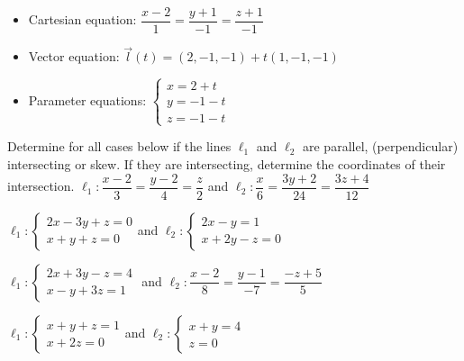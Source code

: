 \begin{Answer}
\begin{itemize}
		    \item Cartesian equation: $\dfrac{x-2}{1} = \dfrac{y+1}{-1} = \dfrac{z+1}{-1} $ \\[0.2cm]  
            \item Vector equation: $\vec l(t) = (2,-1,-1) + t (1,-1,-1)$ \\[0.2cm]
            \item Parameter equations: $\left\{ \begin{array}{l} x = 2+t \\ y = -1-t \\ z = -1-t \end{array} \right.$
		\end{itemize}

\end{Answer}

\begin{Exercise} Determine for all cases below if the lines $\ell_1$ and $\ell_2$ are parallel, (perpendicular) intersecting or skew. If they are intersecting, determine the coordinates of their intersection.
         \Question[difficulty = 1] $\ell_1: \dfrac{x-2}{3}=\dfrac{y-2}{4}=\dfrac{z}{2}$ \qquad and  \qquad $\ell_2: \dfrac{x}{6}=\dfrac{3y+2}{24}=\dfrac{3z+4}{12}$
   
         \Question[difficulty = 2] $\ell_1: \left\{\begin{array}{l}
         2x-3y+z=0\\x+y+z=0
         \end{array}\right.$\qquad and \qquad
         $\ell_2:\left\{\begin{array}{l}
         2x-y=1\\x+2y-z=0
         \end{array}\right.$
        
         \Question[difficulty = 2] 
         $\ell_1: \left\{\begin{array}{l}
         2x+3y-z=4\\x-y+3z=1
         \end{array}\right.$ \qquad and \qquad
         $\ell_2:
         \dfrac{x-2}{8}=\dfrac{y-1}{-7}=\dfrac{-z+5}{5}
         $
        
         \Question[difficulty = 2] 
         $\ell_1: \left\{\begin{array}{l}
         x+y+z=1\\x+2z=0
         \end{array}\right.$\qquad and \qquad
         $\ell_2:\left\{\begin{array}{l}
         x+y=4\\z=0
         \end{array}\right.$

\end{Exercise}

